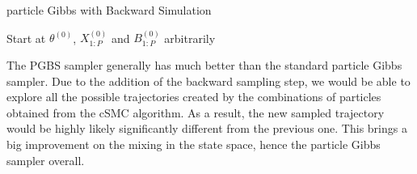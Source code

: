 \documentclass[12pt,a4paper]{article}
\begin{document}
\begin{algorithm}[htb!]
    \caption{particle Gibbs with Backward Simulation}\label{Alg: PGBSi}
    Start at $\theta^{(0)}$, $X_{1:P}^{(0)}$ and $B_{1:P}^{(0)}$ arbitrarily\;
\end{algorithm}
The PGBS sampler generally has much better than the standard particle Gibbs sampler. Due to the addition of the backward sampling step, we would be able to explore all the possible trajectories created by the combinations of particles obtained from the cSMC algorithm. As a result, the new sampled trajectory would be highly likely significantly different from the previous one. This brings a big improvement on the mixing in the state space, hence the particle Gibbs sampler overall. 
\end{document}
